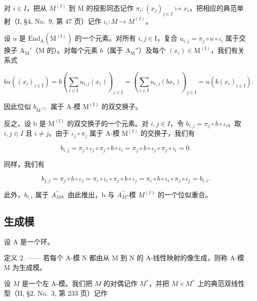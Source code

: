 对 \(i \in I\)，把从 \(M^{(I)}\) 到 M 的投影同态记作 \(\pi_{i} : (x_{j})_{j \in I} \mapsto x_{i}\)，把相应的典范单射（I, §4, No.~9, 第 47 页）记作 \(\iota_{i} : M \to M^{(I)}\)。

设 \(u\) 是 \(\mathrm{End}_{\mathrm{A}}(\mathrm{M}^{(\mathrm{I})})\) 的一个元素。对所有 \(i,j \in \mathrm{I}\)，复合 \(u_{i,j} = \pi_j \circ u \circ \iota_i\) 属于交换子 \(\mathrm{A}_{\mathrm{M}}'\)（\(\mathrm{M}\) 的）。对每个元素 \(b\)（属于 \(\mathrm{A}_{\mathrm{M}}''\)）及每个 \((x_i) \in \mathrm{M}^{(\mathrm{I})}\)，我们有关系式

\[
b u \left(\left(x _ {i}\right) _ {i \in \mathrm{I}}\right) = b \left(\sum_ {i \in \mathrm{I}} u _ {i, j} \left(x _ {i}\right)\right) _ {j \in \mathrm{I}} = \left(\sum_ {i \in \mathrm{I}} u _ {i, j} \left(b x _ {i}\right)\right) _ {j \in \mathrm{I}} = u \left(b \left(x _ {i}\right) _ {i \in \mathrm{I}}\right).
\]

因此位似 \(b_{\mathrm{M}^{(\mathrm{I})}}\) 属于 A-模 \(\mathrm{M}^{(\mathrm{I})}\) 的双交换子。

反之，设 b 是 \(\mathrm{M}^{(\mathrm{I})}\) 的双交换子的一个元素。对 \(i,j\in I\)，令 \(b_{i,j}=\pi_{j}\circ b\circ\iota_{i}\)。取 \(i,j\in I\) 且 \(i\neq j\)。由于 \(\iota_{j}\circ\pi_{j}\) 属于 A-模 \(\mathrm{M}^{(\mathrm{I})}\) 的交换子，我们有

\[
b _ {i, j} = \pi_ {j} \circ \iota_ {j} \circ \pi_ {j} \circ b \circ \iota_ {i} = \pi_ {j} \circ b \circ \iota_ {j} \circ \pi_ {j} \circ \iota_ {i} = 0.
\]

同样，我们有

\[
b _ {j, j} = \pi_ {j} \circ b \circ \iota_ {j} = \pi_ {i} \circ \iota_ {i} \circ \pi_ {j} \circ b \circ \iota_ {j} = \pi_ {i} \circ b \circ \iota_ {i} \circ \pi_ {j} \circ \iota_ {j} = b _ {i, i}.
\]

此外，\(b_{i,i}\) 属于 \(A_{M}^{\prime\prime}\)。由此推出，b 与 \(A_{M}^{\prime\prime}\)-模 \(M^{(I)}\) 的一个位似重合。

\subsection{生成模}

设 \(\mathrm{A}\) 是一个环。

定义 2. —— 若每个 A-模 N 都由从 M 到 N 的 A-线性映射的像生成，则称 A-模 M 为生成模。

设 \(M\) 是一个左 A-模。我们把 \(M\) 的对偶记作 \(M^*\)，并把 \(M \times M^*\) 上的典范双线性型（II, §2, No.~3, 第 233 页）记作

